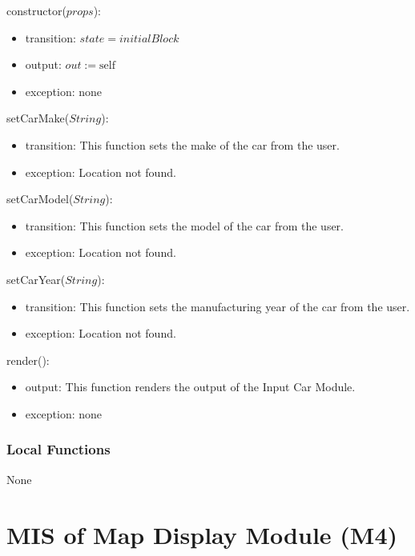 \documentclass[12pt, titlepage]{article}
\begin{document}
\noindent constructor($props$):
\begin{itemize}
\item transition: $\mathit{state} = initialBlock$
\item output: $out := \mbox{self}$
\item exception: none
\end{itemize}

\noindent setCarMake($String$):
\begin{itemize}
\item transition: This function sets the make of the car from the user.
\item exception: Location not found.
\end{itemize}

\noindent setCarModel($String$):
\begin{itemize}
\item transition: This function sets the model of the car from the user.
\item exception: Location not found.
\end{itemize}

\noindent setCarYear($String$):
\begin{itemize}
\item transition: This function sets the manufacturing year of the car from the user.
\item exception: Location not found.
\end{itemize}

\noindent render():
\begin{itemize}
\item output: This function renders the output of the Input Car Module.
\item exception: none
\end{itemize}

\subsubsection{Local Functions}

None

\newpage




\section{MIS of Map Display Module (M4)} 
\end{document}
